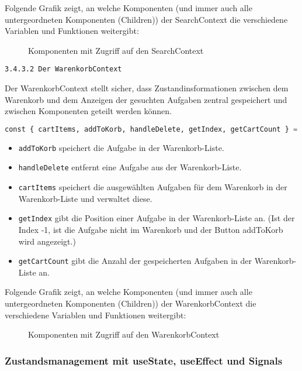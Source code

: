 Folgende Grafik zeigt, an welche Komponenten (und immer auch alle untergeordneten Komponenten (Children)) der SearchContext die verschiedene Variablen und Funktionen weitergibt:
\begin{figure}[H]
\caption{Komponenten mit Zugriff auf den SearchContext \cite{fig:all}}
\end{figure}


\texttt{3.4.3.2 Der WarenkorbContext}

Der WarenkorbContext stellt sicher, dass Zustandinsformationen zwischen dem Warenkorb und dem Anzeigen der gesuchten Aufgaben zentral gespeichert und zwischen Komponenten geteilt werden können.

\begin{lstlisting}[language=Python]
const { cartItems, addToKorb, handleDelete, getIndex, getCartCount } = useContext(WarenkorbContext);
 \end{lstlisting} 

 \begin{itemize}

  \item \texttt{addToKorb} speichert die Aufgabe in der Warenkorb-Liste.
  \item \texttt{handleDelete} entfernt eine Aufgabe aus der Warenkorb-Liste.
  \item  \texttt{cartItems} speichert die ausgewählten Aufgaben für dem Warenkorb in der Warenkorb-Liste und verwaltet diese.
  \item \texttt{getIndex} gibt die Position einer Aufgabe in der Warenkorb-Liste an. (Ist der Index -1, ist die Aufgabe nicht im Warenkorb und der Button addToKorb wird angezeigt.)
  \item \texttt{getCartCount} gibt die Anzahl der gespeicherten Aufgaben in der Warenkorb-Liste an.
 \end{itemize}

 Folgende Grafik zeigt, an welche Komponenten (und immer auch alle untergeordneten Komponenten (Children)) der WarenkorbContext die verschiedene Variablen und Funktionen weitergibt:
 \begin{figure}[ht]
 \caption{Komponenten mit Zugriff auf den WarenkorbContext \cite{fig:all2}}
 \end{figure}


 \subsubsection{Zustandsmanagement mit useState, useEffect und Signals}

